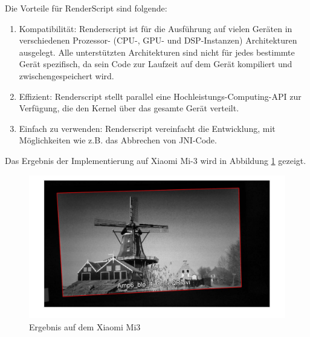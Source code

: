 Die Vorteile für RenderScript sind folgende:
\begin{enumerate}
 \item Kompatibilität: Renderscript ist für die Ausführung auf vielen Geräten in verschiedenen Prozessor- (CPU-, GPU- und DSP-Instanzen) Architekturen ausgelegt. Alle unterstützten Architekturen sind nicht für jedes bestimmte Gerät spezifisch, da sein Code zur Laufzeit auf dem Gerät kompiliert und zwischengespeichert wird.
 \item Effizient: Renderscript stellt parallel eine Hochleistungs-Computing-API zur Verfügung, die den Kernel über das gesamte Gerät verteilt.
 \item Einfach zu verwenden: Renderscript vereinfacht die Entwicklung, mit Möglichkeiten wie z.B. das Abbrechen von JNI-Code.
\end{enumerate}

Das Ergebnis der Implementierung auf Xiaomi Mi-3 wird in Abbildung \ref{fig:Ergebnis3} gezeigt.

\begin{figure}[H]
 \centering 
  \includegraphics[keepaspectratio,width=1.0\textwidth]{images/5_Implementirung/2/modulation.pdf}
 \caption{Ergebnis auf dem Xiaomi Mi3}
 \label{fig:Ergebnis3}
\end{figure}
